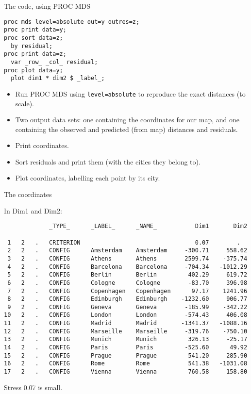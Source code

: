 \documentclass[pdf]{prosper}
\begin{document}
\begin{slide}{The code, using PROC MDS}

\begin{verbatim}
proc mds level=absolute out=y outres=z;
proc print data=y;
proc sort data=z;
  by residual;
proc print data=z;
  var _row_ _col_ residual;
proc plot data=y;
  plot dim1 * dim2 $ _label_;
\end{verbatim}

  \begin{itemize}
  \item Run PROC MDS using \verb-level=absolute- to reproduce the exact distances (to scale).
  \item Two output data sets: one containing the coordinates for our map, and one containing the observed and predicted (from map) distances and residuals.
  \item Print coordinates.
  \item Sort residuals and print them (with the cities they belong to).
  \item Plot coordinates, labelling each point by its city.
  \end{itemize}
  
\end{slide}

\begin{slide}{The coordinates}

In Dim1 and Dim2:
{\scriptsize
\begin{verbatim}
             _TYPE_      _LABEL_      _NAME_           Dim1       Dim2
 
 1   2   .   CRITERION                                 0.07        .  
 2   2   .   CONFIG      Amsterdam    Amsterdam     -300.71     558.62
 3   2   .   CONFIG      Athens       Athens        2599.74    -375.74
 4   2   .   CONFIG      Barcelona    Barcelona     -704.34   -1012.29
 5   2   .   CONFIG      Berlin       Berlin         402.29     619.72
 6   2   .   CONFIG      Cologne      Cologne        -83.70     396.98
 7   2   .   CONFIG      Copenhagen   Copenhagen      97.17    1241.96
 8   2   .   CONFIG      Edinburgh    Edinburgh    -1232.60     906.77
 9   2   .   CONFIG      Geneva       Geneva        -185.99    -342.22
10   2   .   CONFIG      London       London        -574.43     406.08
11   2   .   CONFIG      Madrid       Madrid       -1341.37   -1088.16
12   2   .   CONFIG      Marseille    Marseille     -319.76    -750.10
13   2   .   CONFIG      Munich       Munich         326.13     -25.17
14   2   .   CONFIG      Paris        Paris         -525.60      49.92
15   2   .   CONFIG      Prague       Prague         541.20     285.90
16   2   .   CONFIG      Rome         Rome           541.38   -1031.08
17   2   .   CONFIG      Vienna       Vienna         760.58     158.80
\end{verbatim}
}
Stress 0.07 is small.
  
\end{slide}
\end{document}
